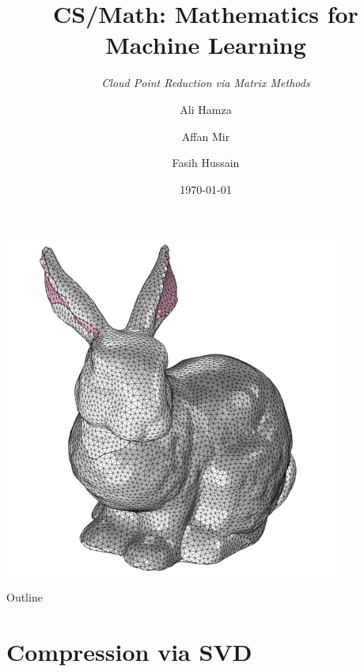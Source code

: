 \documentclass[aspectratio=169]{beamer}
\title %
{ CS/Math: Mathematics for Machine Learning}
\subtitle{\Large \textit {Cloud Point Reduction via Matrix Methods}}
\author[Hamza, Hussain, Mir] %
{Ali Hamza \and Affan Mir \and Fasih Hussain}
\institute{Habib University} %
\date{\today} %
\begin{document}
\begin{frame}
  \titlepage
  \begin{center}
      \includegraphics[scale=0.2]{images/img.png}
  \end{center}
\end{frame}
\setcounter{tocdepth}{1}
\begin{frame}{Outline}

    \tableofcontents
\end{frame}




\section{Compression via SVD}
\end{document}

